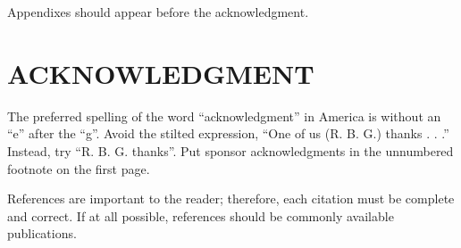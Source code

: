 \documentclass[letterpaper, 10 pt, conference]{ieeeconf}  %
\begin{document}
Appendixes should appear before the acknowledgment.

\section*{ACKNOWLEDGMENT}

The preferred spelling of the word ``acknowledgment'' in America is without an ``e'' after the ``g''. Avoid the stilted expression, ``One of us (R. B. G.) thanks . . .''  Instead, try ``R. B. G. thanks''. Put sponsor acknowledgments in the unnumbered footnote on the first page.




References are important to the reader; therefore, each citation must be complete and correct. If at all possible, references should be commonly available publications.





\end{document}
